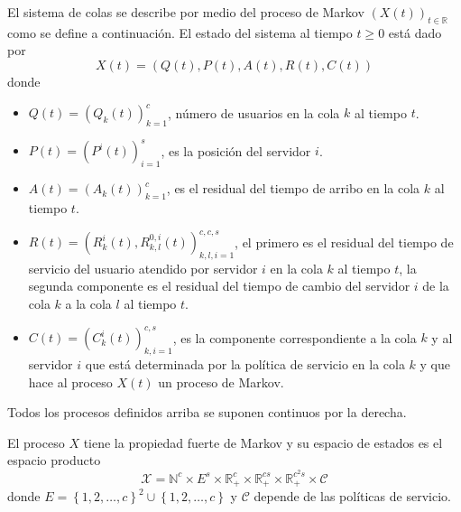 \documentclass{article}
\newcommand{\nat}{\mathbb{N}}
\newcommand{\rea}{\mathbb{R}}
\begin{document}
El sistema de colas se describe por medio del proceso de Markov
$\left(X\left(t\right)\right)_{t\in\rea}$ como se define a
continuaci\'on. El estado del sistema al tiempo $t\geq0$ est\'a dado
por
\[X\left(t\right)=\left(Q\left(t\right),P\left(t\right),A\left(t\right),R\left(t\right),C\left(t\right)\right)\]
donde
\begin{itemize}
\item
$Q\left(t\right)=\left(Q_{k}\left(t\right)\right)_{k=1}^{c}$,
n\'umero de usuarios en la cola $k$ al tiempo $t$. \item
$P\left(t\right)=\left(P^{i}\left(t\right)\right)_{i=1}^{s}$, es
la posici\'on del servidor $i$. \item
$A\left(t\right)=\left(A_{k}\left(t\right)\right)_{k=1}^{c}$, es
el residual del tiempo de arribo en la cola $k$ al tiempo $t$.
\item
$R\left(t\right)=\left(R_{k}^{i}\left(t\right),R_{k,l}^{0,i}\left(t\right)\right)_{k,l,i=1}^{c,c,s}$,
el primero es el residual del tiempo de servicio del usuario
atendido por servidor $i$ en la cola $k$ al tiempo $t$, la segunda
componente es el residual del tiempo de cambio del servidor $i$ de
la cola $k$ a la cola $l$ al tiempo $t$. \item
$C\left(t\right)=\left(C_{k}^{i}\left(t\right)\right)_{k,i=1}^{c,s}$,
es la componente correspondiente a la cola $k$ y al servidor $i$
que est\'a determinada por la pol\'itica de servicio en la cola $k$
y que hace al proceso $X\left(t\right)$ un proceso de Markov.
\end{itemize}
Todos los procesos definidos arriba se suponen continuos por la
derecha.

El proceso $X$ tiene la propiedad fuerte de Markov y su espacio de
estados es el espacio producto
\[\mathcal{X}=\nat^{c}\times E^{s}\times \rea_{+}^{c}\times\rea_{+}^{cs}\times\rea_{+}^{c^{2}s}\times \mathcal{C}\] donde $E=\left\{1,2,\ldots,c\right\}^{2}\cup\left\{1,2,\ldots,c\right\}$ y $\mathcal{C}$  depende de las pol\'iticas de servicio.
\end{document}

